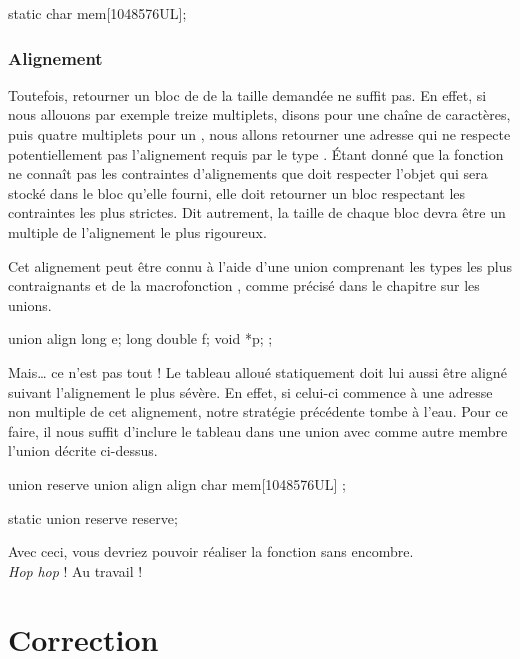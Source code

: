 \begin{C}
static char mem[1048576UL];
\end{C}

\subsubsection{Alignement}
\label{alignement}

Toutefois, retourner un bloc de  de la taille demandée ne
suffit pas. En effet, si nous allouons par exemple treize multiplets,
disons pour une chaîne de caractères, puis quatre multiplets pour un
, nous allons retourner une adresse qui ne respecte
potentiellement pas l'alignement requis par le type . Étant
donné que la fonction  ne connaît pas les
contraintes d'alignements que doit respecter l'objet qui sera stocké
dans le bloc qu'elle fourni, elle doit retourner un bloc respectant les
contraintes les plus strictes. Dit autrement, la taille de chaque bloc
devra être un multiple de l'alignement le plus rigoureux.

Cet alignement peut être connu à l'aide d'une union comprenant les types
les plus contraignants et de la macrofonction , comme
précisé dans le chapitre sur les unions.

\begin{C}
union align
{
    long e;
    long double f;
    void *p;
};
\end{C}

Mais\ldots{} ce n'est pas tout ! Le tableau alloué statiquement doit lui
aussi être aligné suivant l'alignement le plus sévère. En effet, si
celui-ci commence à une adresse non multiple de cet alignement, notre
stratégie précédente tombe à l'eau. Pour ce faire, il nous suffit
d'inclure le tableau dans une union avec comme autre membre l'union
décrite ci-dessus.

\begin{C}
union reserve
{
    union align align
    char mem[1048576UL]
};

static union reserve reserve;
\end{C}

Avec ceci, vous devriez pouvoir réaliser la fonction
 sans encombre.\\
\emph{Hop} \emph{hop} ! Au travail !

\section{Correction}
\label{correction-21}

